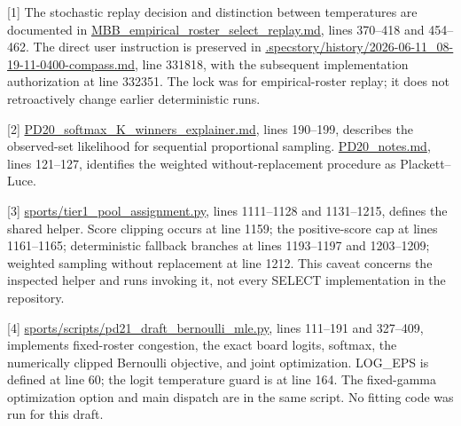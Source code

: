 {[}1{]} The stochastic replay decision and distinction between temperatures are documented in \href{file:///Users/charleslevine/Library/CloudStorage/Dropbox/1-Documents/00-\%20Dissertation/0-Next_Chapter/Code_and_Data/New\%20SQL\%20and\%20PY\%20Code/Cursor\%20Workspace\%20PDE/3-Master_Plan/re_entry/HEROs_and_PASSes/MBB_empirical_roster_select_replay.md}{MBB\_\allowbreak{}empirical\_\allowbreak{}roster\_\allowbreak{}select\_\allowbreak{}replay.md}, lines 370--418 and 454--462. The direct user instruction is preserved in \href{file:///Users/charleslevine/Library/CloudStorage/Dropbox/1-Documents/00-\%20Dissertation/0-Next_Chapter/Code_and_Data/New\%20SQL\%20and\%20PY\%20Code/Cursor\%20Workspace\%20PDE/.specstory/history/2026-06-11_08-19-11-0400-compass.md}{.specstory/history/2026-06-11\_\allowbreak{}08-19-11-0400-compass.md}, line 331818, with the subsequent implementation authorization at line 332351. The lock was for empirical-roster replay; it does not retroactively change earlier deterministic runs.

{[}2{]} \href{file:///Users/charleslevine/Library/CloudStorage/Dropbox/1-Documents/00-\%20Dissertation/0-Next_Chapter/Code_and_Data/New\%20SQL\%20and\%20PY\%20Code/Cursor\%20Workspace\%20PDE/3-Master_Plan/Alex_stuff/PD20_softmax_K_winners_explainer.md}{PD20\_\allowbreak{}softmax\_\allowbreak{}K\_\allowbreak{}winners\_\allowbreak{}explainer.md}, lines 190--199, describes the observed-set likelihood for sequential proportional sampling. \href{file:///Users/charleslevine/Library/CloudStorage/Dropbox/1-Documents/00-\%20Dissertation/0-Next_Chapter/Code_and_Data/New\%20SQL\%20and\%20PY\%20Code/Cursor\%20Workspace\%20PDE/transcripts/PD20_notes.md}{PD20\_\allowbreak{}notes.md}, lines 121--127, identifies the weighted without-replacement procedure as Plackett--Luce.

{[}3{]} \href{file:///Users/charleslevine/Library/CloudStorage/Dropbox/1-Documents/00-\%20Dissertation/0-Next_Chapter/Code_and_Data/New\%20SQL\%20and\%20PY\%20Code/Cursor\%20Workspace\%20PDE/sports/tier1_pool_assignment.py}{sports/tier1\_\allowbreak{}pool\_\allowbreak{}assignment.py}, lines 1111--1128 and 1131--1215, defines the shared helper. Score clipping occurs at line 1159; the positive-score cap at lines 1161--1165; deterministic fallback branches at lines 1193--1197 and 1203--1209; weighted sampling without replacement at line 1212. This caveat concerns the inspected helper and runs invoking it, not every SELECT implementation in the repository.

{[}4{]} \href{file:///Users/charleslevine/Library/CloudStorage/Dropbox/1-Documents/00-\%20Dissertation/0-Next_Chapter/Code_and_Data/New\%20SQL\%20and\%20PY\%20Code/Cursor\%20Workspace\%20PDE/sports/scripts/pd21_draft_bernoulli_mle.py}{sports/scripts/pd21\_\allowbreak{}draft\_\allowbreak{}bernoulli\_\allowbreak{}mle.py}, lines 111--191 and 327--409, implements fixed-roster congestion, the exact board logits, softmax, the numerically clipped Bernoulli objective, and joint optimization. LOG\_\allowbreak{}EPS is defined at line 60; the logit temperature guard is at line 164. The fixed-gamma optimization option and main dispatch are in the same script. No fitting code was run for this draft.

